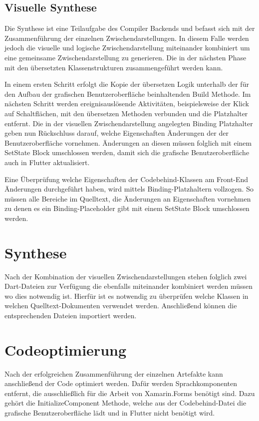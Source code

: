 \subsection{Visuelle Synthese}

Die Synthese ist eine Teilaufgabe des Compiler Backends und befasst sich mit der Zusammenführung der einzelnen Zwischendarstellungen.  In diesem Falle werden jedoch die visuelle und logische Zwischendarstellung miteinander kombiniert um eine gemeinsame Zwischendarstellung zu generieren.  Die in der nächsten Phase mit den übersetzten Klassenstrukturen zusammengeführt werden kann. 

In einem ersten Schritt erfolgt die Kopie der übersetzen Logik unterhalb der für den Aufbau der grafischen Benutzeroberfläche beinhaltenden Build Methode.  Im nächsten Schritt werden ereignisauslösende Aktivitäten,  beispielsweise der Klick auf Schaltflächen,  mit den übersetzen Methoden verbunden und die Platzhalter entfernt.  Die in der visuellen Zwischendarstellung angelegten Binding Platzhalter geben nun Rückschluss darauf,  welche Eigenschaften Änderungen der der Benutzeroberfläche vornehmen.  Änderungen an diesen müssen folglich mit einem SetState Block umschlossen werden, damit sich die grafische Benutzeroberfläche auch in Flutter aktualisiert. 

Eine Überprüfung welche Eigenschaften der Codebehind-Klassen am Front-End Änderungen durchgeführt haben, wird mittels Binding-Platzhaltern vollzogen.  So müssen alle Bereiche im Quelltext, die Änderungen an Eigenschaften vornehmen zu denen es ein Binding-Placeholder gibt mit einem SetState Block umschlossen werden.

\section{Synthese}
Nach der Kombination der visuellen Zwischendarstellungen stehen folglich zwei Dart-Dateien zur Verfügung die ebenfalls miteinander kombiniert werden müssen wo dies notwendig ist.  Hierfür ist es notwendig zu überprüfen welche Klassen in welchen Quelltext-Dokumenten verwendet werden.  Anschließend können die entsprechenden Dateien importiert werden. 

\section{Codeoptimierung}

Nach der erfolgreichen Zusammenführung der einzelnen Artefakte kann anschließend der Code optimiert werden.  Dafür werden Sprachkomponenten entfernt,  die ausschließlich für die Arbeit von Xamarin.Forms benötigt sind.  Dazu gehört die \glq InitializeComponent\grq{} Methode,  welche aus der Codebehind-Datei die grafische Benutzeroberfläche lädt und in Flutter nicht benötigt wird.  

